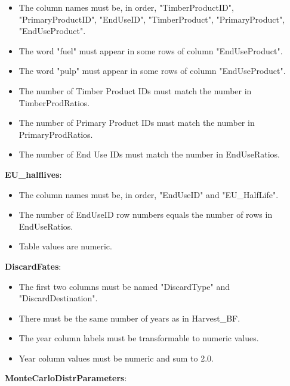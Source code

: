 \documentclass[
  openany]{book}
\providecommand{\tightlist}{%
  \setlength{\itemsep}{0pt}\setlength{\parskip}{0pt}}
\begin{document}
\begin{itemize}
\tightlist
\item
  The column names must be, in order, "TimberProductID", "PrimaryProductID", "EndUseID", "TimberProduct", "PrimaryProduct", "EndUseProduct".\\
\item
  The word "fuel" must appear in some rows of column "EndUseProduct".\\
\item
  The word "pulp" must appear in some rows of column "EndUseProduct".\\
\item
  The number of Timber Product IDs must match the number in TimberProdRatios.\\
\item
  The number of Primary Product IDs must match the number in PrimaryProdRatios.\\
\item
  The number of End Use IDs must match the number in EndUseRatios.
\end{itemize}

\textbf{EU\_halflives}:

\begin{itemize}
\tightlist
\item
  The column names must be, in order, "EndUseID" and "EU\_HalfLife".\\
\item
  The number of EndUseID row numbers equals the number of rows in EndUseRatios.\\
\item
  Table values are numeric.
\end{itemize}

\textbf{DiscardFates}:

\begin{itemize}
\tightlist
\item
  The first two columns must be named "DiscardType" and "DiscardDestination".\\
\item
  There must be the same number of years as in Harvest\_BF.\\
\item
  The year column labels must be transformable to numeric values.\\
\item
  Year column values must be numeric and sum to 2.0.
\end{itemize}

\textbf{MonteCarloDistrParameters}:
\end{document}
